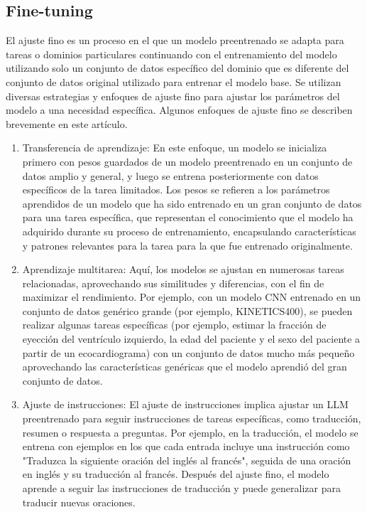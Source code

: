 \documentclass[12pt,twocolumn]{article}
\begin{document}
\subsection{Fine-tuning}
El ajuste fino es un proceso en el que un modelo preentrenado se adapta para tareas o dominios particulares continuando con el entrenamiento del modelo utilizando solo un conjunto de datos específico del dominio que es diferente del conjunto de datos original utilizado para entrenar el modelo base. 
Se utilizan diversas estrategias y enfoques de ajuste fino para ajustar los parámetros del modelo a una necesidad específica. Algunos enfoques de ajuste fino se describen brevemente en este artículo.
\begin{enumerate}
\item Transferencia de aprendizaje: En este enfoque, un modelo se inicializa primero con pesos guardados de un modelo preentrenado en un conjunto de datos amplio y general, y luego se entrena posteriormente con datos específicos de la tarea limitados. 
Los pesos se refieren a los parámetros aprendidos de un modelo que ha sido entrenado en un gran conjunto de datos para una tarea específica, que representan el conocimiento que el modelo ha adquirido durante su proceso de entrenamiento, encapsulando características y patrones relevantes para la tarea para la que fue entrenado originalmente.
\item Aprendizaje multitarea: Aquí, los modelos se ajustan en numerosas tareas relacionadas, aprovechando sus similitudes y diferencias, con el fin de maximizar el rendimiento. 
Por ejemplo, con un modelo CNN entrenado en un conjunto de datos genérico grande (por ejemplo, KINETICS400), se pueden realizar algunas tareas específicas (por ejemplo, estimar la fracción de eyección del ventrículo izquierdo, la edad del paciente y el sexo del paciente a partir de un ecocardiograma) con un conjunto de datos mucho más pequeño aprovechando las características genéricas que el modelo aprendió del gran conjunto de datos.
\item Ajuste de instrucciones: El ajuste de instrucciones implica ajustar un LLM preentrenado para seguir instrucciones de tareas específicas, como traducción, resumen o respuesta a preguntas. 
Por ejemplo, en la traducción, el modelo se entrena con ejemplos en los que cada entrada incluye una instrucción como "Traduzca la siguiente oración del inglés al francés", seguida de una oración en inglés y su traducción al francés. 
Después del ajuste fino, el modelo aprende a seguir las instrucciones de traducción y puede generalizar para traducir nuevas oraciones.
\end{enumerate}
\end{document}
